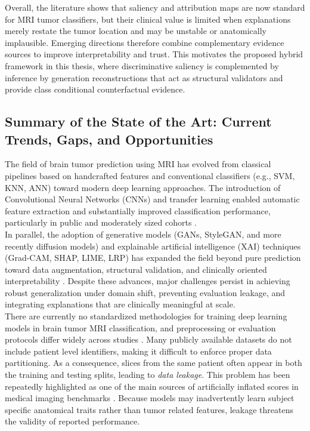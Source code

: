 \noindent
Overall, the literature shows that saliency and attribution maps are now standard for MRI tumor classifiers, but their clinical value is limited when explanations merely restate the tumor location and may be unstable or anatomically implausible. Emerging directions therefore combine complementary evidence sources to improve interpretability and trust. This motivates the proposed hybrid framework in this thesis, where discriminative saliency is complemented by inference by generation reconstructions that act as structural validators and provide class conditional counterfactual evidence.



\subsection{Summary of the State of the Art: Current Trends, Gaps, and Opportunities}


The field of brain tumor prediction using MRI has evolved from classical pipelines based on handcrafted features and conventional classifiers (e.g., SVM, KNN, ANN) toward modern deep learning approaches. The introduction of Convolutional Neural Networks (CNNs) and transfer learning enabled automatic feature extraction and substantially improved classification performance, particularly in public and moderately sized cohorts \cite{Cheng2015,abiwinanda,deepak2019brain,Rehman2020}.\\

In parallel, the adoption of generative models (GANs, StyleGAN, and more recently diffusion models) and explainable artificial intelligence (XAI) techniques (Grad-CAM, SHAP, LIME, LRP) has expanded the field beyond pure prediction toward data augmentation, structural validation, and clinically oriented interpretability \cite{GHASSEMI2020101678,li2020tumorgan,Fetty2020,gaur2022explanation,mandloi2024explainable,zuo2025multichannel}. Despite these advances, major challenges persist in achieving robust generalization under domain shift, preventing evaluation leakage, and integrating explanations that are clinically meaningful at scale.\\

There are currently no standardized methodologies for training deep learning models in brain tumor MRI classification, and preprocessing or evaluation protocols differ widely across studies \cite{Rehman2020,Cheng2015}. Many publicly available datasets do not include patient level identifiers, making it difficult to enforce proper data partitioning. As a consequence, slices from the same patient often appear in both the training and testing splits, leading to \textit{data leakage}. This problem has been repeatedly highlighted as one of the main sources of artificially inflated scores in medical imaging benchmarks \cite{abiwinanda,deepak2019brain}. Because models may inadvertently learn subject specific anatomical traits rather than tumor related features, leakage threatens the validity of reported performance.\\

